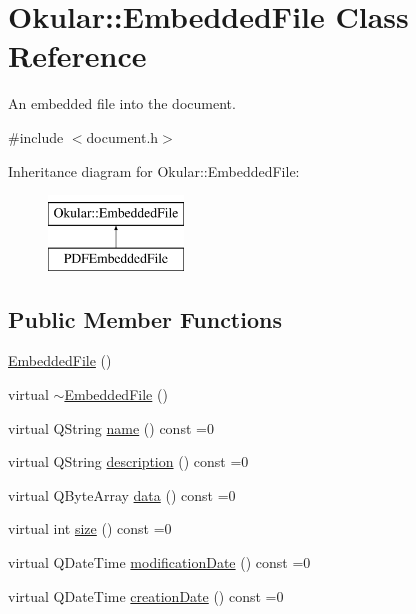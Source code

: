\hypertarget{classOkular_1_1EmbeddedFile}{\section{Okular\+:\+:Embedded\+File Class Reference}
\label{classOkular_1_1EmbeddedFile}
}


An embedded file into the document.  




{\ttfamily \#include $<$document.\+h$>$}

Inheritance diagram for Okular\+:\+:Embedded\+File\+:\begin{figure}[H]
\begin{center}
\leavevmode
\includegraphics[height=2.000000cm]{classOkular_1_1EmbeddedFile}
\end{center}
\end{figure}
\subsection*{Public Member Functions}
\begin{DoxyCompactItemize}
\item 
\hyperlink{classOkular_1_1EmbeddedFile_a325a26e17bc0867f2423c08580a59b94}{Embedded\+File} ()
\item 
virtual \hyperlink{classOkular_1_1EmbeddedFile_ad3a6e8a30912d44af50ae3ea208f5bbf}{$\sim$\+Embedded\+File} ()
\item 
virtual Q\+String \hyperlink{classOkular_1_1EmbeddedFile_a70fcfea705979ce6a31b989fc92a8f2b}{name} () const =0
\item 
virtual Q\+String \hyperlink{classOkular_1_1EmbeddedFile_a91a6efdeb1423a4030ce438b2a58c9a0}{description} () const =0
\item 
virtual Q\+Byte\+Array \hyperlink{classOkular_1_1EmbeddedFile_af41767e900a9b6078fcc8705960a31a7}{data} () const =0
\item 
virtual int \hyperlink{classOkular_1_1EmbeddedFile_a16654b3db51a4c46276516f7987c975d}{size} () const =0
\item 
virtual Q\+Date\+Time \hyperlink{classOkular_1_1EmbeddedFile_a4f8bf566b56f606a2c1756b04930e5f0}{modification\+Date} () const =0
\item 
virtual Q\+Date\+Time \hyperlink{classOkular_1_1EmbeddedFile_a38d16f20c546229d65f2afac1e6f162b}{creation\+Date} () const =0
\end{DoxyCompactItemize}


